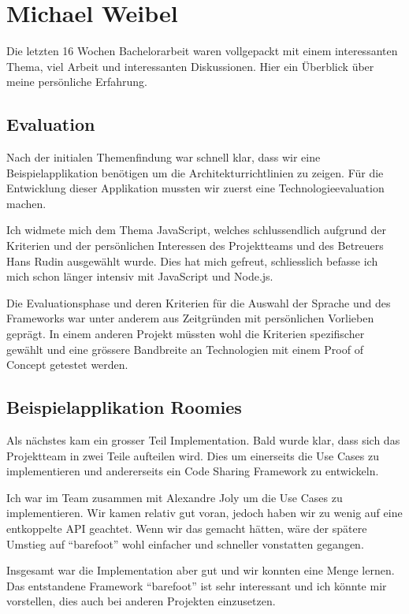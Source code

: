 \section{Michael Weibel}

Die letzten 16 Wochen Bachelorarbeit waren vollgepackt mit einem interessanten Thema, viel Arbeit und interessanten Diskussionen. Hier ein Überblick über meine persönliche Erfahrung.

\subsection*{Evaluation}
Nach der initialen Themenfindung war schnell klar, dass wir eine Beispielapplikation benötigen um die Architekturrichtlinien zu zeigen. Für die Entwicklung dieser Applikation mussten wir zuerst eine Technologieevaluation machen.

Ich widmete mich dem Thema JavaScript, welches schlussendlich aufgrund der Kriterien und der persönlichen Interessen des Projektteams und des Betreuers Hans Rudin ausgewählt wurde. Dies hat mich gefreut, schliesslich befasse ich mich schon länger intensiv mit JavaScript und Node.js.

Die Evaluationsphase und deren Kriterien für die Auswahl der Sprache und des Frameworks war unter anderem aus Zeitgründen mit persönlichen Vorlieben geprägt. In einem anderen Projekt müssten wohl die Kriterien spezifischer gewählt und eine grössere Bandbreite an Technologien mit einem Proof of Concept getestet werden.

\subsection*{Beispielapplikation Roomies}
Als nächstes kam ein grosser Teil Implementation. Bald wurde klar, dass sich das Projektteam in zwei Teile aufteilen wird. Dies um einerseits die Use Cases zu implementieren und andererseits ein Code Sharing Framework zu entwickeln.

Ich war im Team zusammen mit Alexandre Joly um die Use Cases zu implementieren. Wir kamen relativ gut voran, jedoch haben wir zu wenig auf eine entkoppelte API geachtet. Wenn wir das gemacht hätten, wäre der spätere Umstieg auf ``barefoot'' wohl einfacher und schneller vonstatten gegangen.

Insgesamt war die Implementation aber gut und wir konnten eine Menge lernen. Das entstandene Framework ``barefoot'' ist sehr interessant und ich könnte mir vorstellen, dies auch bei anderen Projekten einzusetzen.

